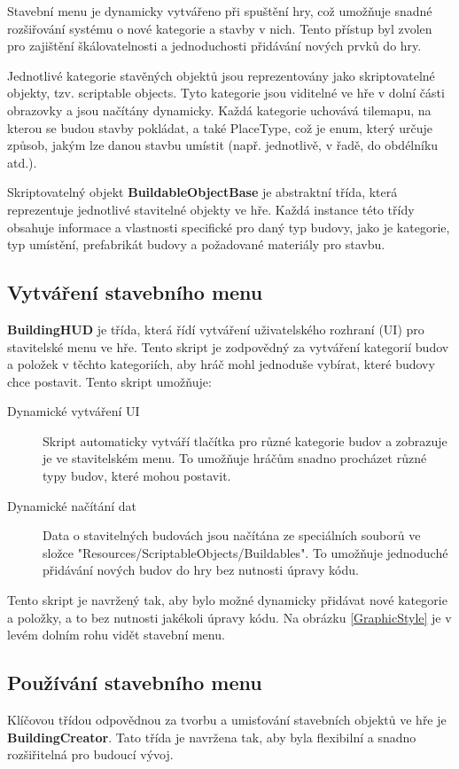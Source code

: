 Stavební menu je dynamicky vytvářeno při spuštění hry, což umožňuje snadné rozšiřování systému o nové kategorie a stavby v nich. Tento přístup byl zvolen pro zajištění škálovatelnosti a jednoduchosti přidávání nových prvků do hry.

Jednotlivé kategorie stavěných objektů jsou reprezentovány jako skriptovatelné objekty, tzv. scriptable objects. Tyto kategorie jsou viditelné ve hře v dolní části obrazovky a jsou načítány dynamicky. Každá kategorie uchovává tilemapu, na kterou se budou stavby pokládat, a také PlaceType, což je enum, který určuje způsob, jakým lze danou stavbu umístit (např. jednotlivě, v řadě, do obdélníku atd.).

Skriptovatelný objekt \textbf{BuildableObjectBase} je abstraktní třída, která reprezentuje jednotlivé stavitelné objekty ve hře. Každá instance této třídy obsahuje informace a vlastnosti specifické pro daný typ budovy, jako je kategorie, typ umístění, prefabrikát budovy a požadované materiály pro stavbu.

\subsection{Vytváření stavebního menu}
\textbf{BuildingHUD} je třída, která řídí vytváření uživatelského rozhraní (UI) pro stavitelské menu ve hře. Tento skript je zodpovědný za vytváření kategorií budov a položek v těchto kategoriích, aby hráč mohl jednoduše vybírat, které budovy chce postavit. Tento skript umožňuje:

\begin{description}
	\item[Dynamické vytváření UI] Skript automaticky vytváří tlačítka pro různé kategorie budov a zobrazuje je ve stavitelském menu. To umožňuje hráčům snadno procházet různé typy budov, které mohou postavit.
	\item[Dynamické načítání dat] Data o stavitelných budovách jsou načítána ze speciálních souborů ve složce "Resources/ScriptableObjects/Buildables". To umožňuje jednoduché přidávání nových budov do hry bez nutnosti úpravy kódu.
\end{description}

Tento skript je navržený tak, aby bylo možné dynamicky přidávat nové kategorie a položky, a to bez nutnosti jakékoli úpravy kódu. Na obrázku \ref{GraphicStyle} je v levém dolním rohu vidět stavební menu.

\subsection{Používání stavebního menu}
Klíčovou třídou odpovědnou za tvorbu a umisťování stavebních objektů ve hře je \textbf{BuildingCreator}. Tato třída je navržena tak, aby byla flexibilní a snadno rozšiřitelná pro budoucí vývoj.

